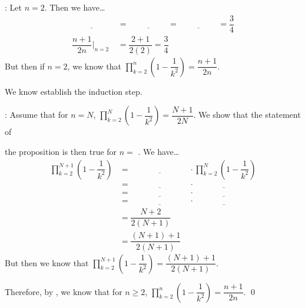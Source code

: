 \documentclass[11pt,letterpaper]{article}
\begin{document}
: Let $n= 2$. Then we have\dots
	\[
	\begin{aligned}
	\underline{\hspace{2cm}}&= \underline{\hspace{2cm}}= \underline{\hspace{2cm}}= \dfrac{3}{4} \\[0.3cm]
	\dfrac{n + 1}{2n} \bigg|_{n= 2}&= \dfrac{2 + 1}{2(2)}= \dfrac{3}{4}
	\end{aligned}
	\]
But then if $n= 2$, we know that $\displaystyle\prod_{k=2}^n \left(1 - \dfrac{1}{k^2} \right)= \dfrac{n + 1}{2n}$. \pspace

We know establish the induction step. \pspace

: Assume that for $n= N$, $\displaystyle\prod_{k=2}^N \left(1 - \dfrac{1}{k^2} \right)= \dfrac{N + 1}{2N}$. We show that the statement of \pspace 

the proposition is then true for $n=$ \underline{\hspace{2cm}}. We have\dots \pspace
	\[
	\begin{aligned}
	\prod_{k=2}^{N+1} \left(1 - \dfrac{1}{k^2} \right)&= \underline{\hspace{3cm}} \cdot \prod_{k=2}^N \left(1 - \dfrac{1}{k^2} \right) \\[0.3cm]
	&= \underline{\hspace{3cm}} \cdot \underline{\hspace{3cm}} \\[0.3cm]
	&= \underline{\hspace{3cm}} \cdot \underline{\hspace{3cm}} \\[0.3cm]
	&= \underline{\hspace{3cm}} \cdot \underline{\hspace{3cm}} \\[0.3cm]
	&= \dfrac{N + 2}{2(N + 1)} \\[0.3cm]
	&= \dfrac{(N + 1) + 1}{2(N + 1)}
	\end{aligned}
	\]
But then we know that $\displaystyle\prod_{k=2}^{N+1} \left(1 - \dfrac{1}{k^2} \right)= \dfrac{(N + 1) + 1}{2(N + 1)}$. \pspace

Therefore, by \underline{\hspace{6cm}}, we know that for $n \geq 2$, $\displaystyle\prod_{k=2}^n \left(1 - \dfrac{1}{k^2} \right)= \dfrac{n + 1}{2n}$. \qed



\newpage
\end{document}
